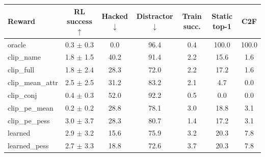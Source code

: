 \begin{tabular}{lcccccc}
\toprule
Reward & RL success $\uparrow$ & Hacked $\downarrow$ & Distractor $\downarrow$ & Train succ. & Static top-1 & C2F \\
\midrule
oracle & 0.3 $\pm$ 0.3 & 0.0 & 96.4 & 0.4 & 100.0 & 100.0 \\
clip\_name & 1.8 $\pm$ 1.5 & 40.2 & 91.4 & 2.2 & 15.6 & 1.6 \\
clip\_full & 1.8 $\pm$ 2.4 & 28.3 & 72.0 & 2.2 & 17.2 & 1.6 \\
clip\_mean\_attr & 2.5 $\pm$ 2.5 & 31.2 & 83.2 & 2.1 & 4.7 & 0.0 \\
clip\_conj & 0.4 $\pm$ 0.3 & 52.0 & 92.2 & 0.5 & 0.0 & 0.0 \\
clip\_pe\_mean & 0.2 $\pm$ 0.2 & 28.8 & 78.1 & 3.0 & 18.8 & 3.1 \\
clip\_pe\_pess & 3.0 $\pm$ 3.7 & 28.3 & 80.7 & 1.4 & 17.2 & 3.1 \\
learned & 2.9 $\pm$ 3.2 & 15.6 & 75.9 & 3.2 & 20.3 & 7.8 \\
learned\_pess & 2.7 $\pm$ 3.3 & 18.8 & 72.6 & 3.7 & 20.3 & 7.8 \\
\bottomrule
\end{tabular}
